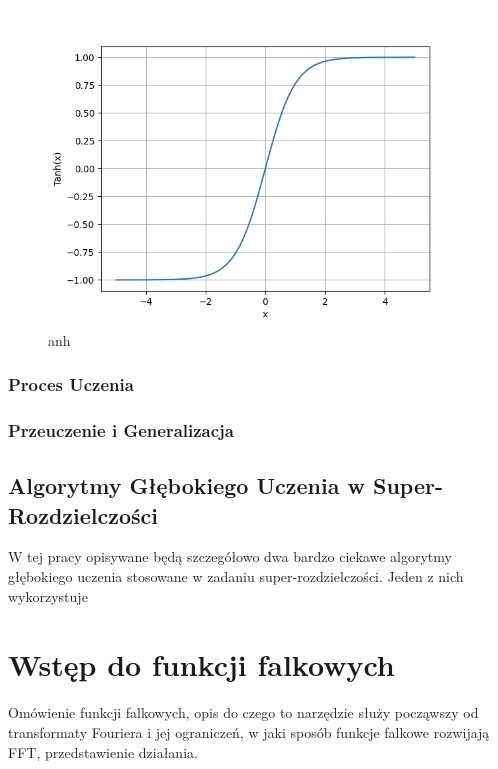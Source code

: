 \begin{figure}[ht]
    \begin{minipage}[t]{0.3\linewidth}
        \includegraphics[width=\linewidth]{Rozdziały/02.Podstawy_teoretyczne/tanh.png}
        \caption{anh}
        \label{fig:image16}
    \end{minipage}
\end{figure}


\subsubsection*{Proces Uczenia}


\subsubsection*{Przeuczenie i Generalizacja}



\subsection*{Algorytmy Głębokiego Uczenia w Super-Rozdzielczości}

W tej pracy opisywane będą szczegółowo dwa bardzo ciekawe algorytmy głębokiego uczenia stosowane w zadaniu super-rozdzielczości. Jeden z nich wykorzystuje 



\newpage
\section{Wstęp do funkcji falkowych}


Omówienie funkcji falkowych, opis do czego to narzędzie służy począwszy od transformaty Fouriera i jej ograniczeń, 
w jaki sposób funkcje falkowe rozwijają FFT, przedstawienie działania.





